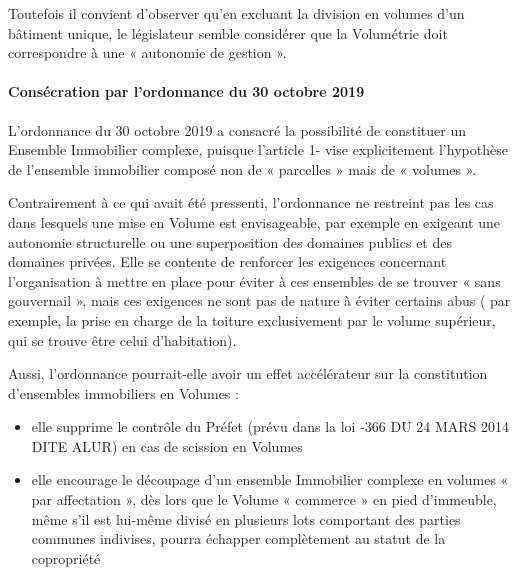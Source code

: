 				Toutefois il convient d’observer qu’en excluant la division en volumes d’un bâtiment unique, le législateur
				semble considérer que la Volumétrie doit correspondre à une « autonomie de gestion ».
				
			\paragraph{Consécration par l’ordonnance du 30 octobre 2019}
				
				L’ordonnance du 30 octobre 2019 a consacré la possibilité de constituer un Ensemble Immobilier
				complexe, puisque l’article 1- \II{} vise explicitement l’hypothèse de l’ensemble immobilier composé non de
				« parcelles » mais de « volumes ».
				
				Contrairement à ce qui avait été pressenti, l’ordonnance ne restreint pas les cas dans lesquels une mise
				en Volume est envisageable, par exemple en exigeant une autonomie structurelle ou une superposition
				des domaines publics et des domaines privées. Elle se contente de renforcer les exigences concernant
				l’organisation à mettre en place pour éviter à ces ensembles de se trouver « sans gouvernail », mais ces
				exigences ne sont pas de nature à éviter certains abus ( par exemple, la prise en charge de la toiture
				exclusivement par le volume supérieur, qui se trouve être celui d’habitation).
				
				Aussi, l’ordonnance pourrait-elle avoir un effet accélérateur sur la constitution d’ensembles immobiliers
				en Volumes :
				\begin{itemize}
					\item  elle supprime le contrôle du Préfet (prévu dans la loi -366 DU 24 MARS 2014 DITE ALUR)
					en cas de scission en Volumes
					\item  elle encourage le découpage d’un ensemble Immobilier complexe en volumes « par
					affectation », dès lors que le Volume « commerce » en pied d’immeuble, même s’il est lui-même
					divisé en plusieurs lots comportant des parties communes indivises, pourra échapper
					complètement au statut de la copropriété
				\end{itemize}
		
